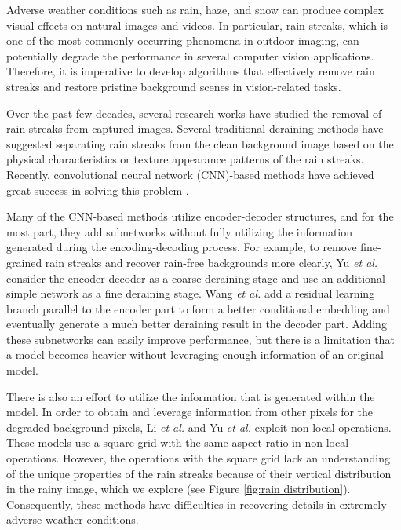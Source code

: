 \documentclass[a4paper,fleqn]{cas-dc}
\begin{document}
Adverse weather conditions such as rain, haze, and snow can produce complex visual effects on natural images and videos. In particular, rain streaks, which is one of the most commonly occurring phenomena in outdoor imaging, can potentially degrade the performance in several computer vision applications. Therefore, it is imperative to develop algorithms that effectively remove rain streaks and restore pristine background scenes in vision-related tasks.

Over the past few decades, several research works have studied the removal of rain streaks from captured images. Several traditional deraining methods have suggested separating rain streaks from the clean background image based on the physical characteristics or texture appearance patterns of the rain streaks. Recently, convolutional neural network (CNN)-based methods have achieved great success in solving this problem \cite{jiang2020multi,li2018non,li2018recurrent,ren2019progressive,wang2019erl,wang2019spatial,yang2019scale,yang2017deep,yu2019gradual,zhang2019image}.





Many of the CNN-based methods utilize encoder-decoder structures, and for the most part, they add subnetworks without fully utilizing the information generated during the encoding-decoding process. For example, to remove fine-grained rain streaks and recover rain-free backgrounds more clearly, Yu \textit{et al.} \cite{yu2019gradual} consider the encoder-decoder as a coarse deraining stage and use an additional simple network as a fine deraining stage. Wang \textit{et al.} \cite{wang2019erl} add a residual learning branch parallel to the encoder part to form a better conditional embedding and eventually generate a much better deraining result in the decoder part. Adding these subnetworks can easily improve performance, but there is a limitation that a model becomes heavier without leveraging enough information of an original model.

There is also an effort to utilize the information that is generated within the model. In order to obtain and leverage information from other pixels for the degraded background pixels, Li \textit{et al.} \cite{li2018non} and Yu \textit{et al.} \cite{yu2019gradual} exploit non-local operations. These models use a square grid with the same aspect ratio in non-local operations. However, the operations with the square grid lack an understanding of the unique properties of the rain streaks because of their vertical distribution in the rainy image, which we explore (see Figure \ref{fig:rain distribution}). Consequently, these methods have difficulties in recovering details in extremely adverse weather conditions.
\end{document}
